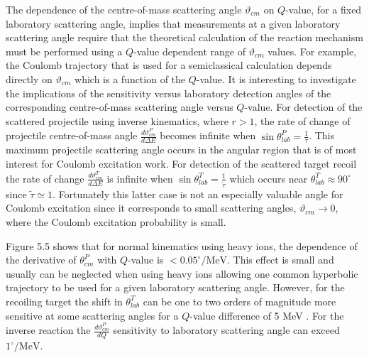 \documentclass[10pt]{article}
\begin{document}
The dependence of the centre-of-mass scattering angle $\vartheta_{c m}$ on $Q$-value, for a fixed laboratory scattering angle, implies that measurements at a given laboratory scattering angle require that the theoretical calculation of the reaction mechanism must be performed using a $Q$-value dependent range of $\vartheta_{c m}$ values. For example, the Coulomb trajectory that is used for a semiclassical calculation depends directly on $\vartheta_{c m}$ which is a function of the $Q$-value. It is interesting to investigate the implications of the sensitivity versus laboratory detection angles of the corresponding centre-of-mass scattering angle versus $Q$-value. For detection of the scattered projectile using inverse kinematics, where $r>1$, the rate of change of projectile centre-of-mass angle $\frac{d \vartheta_{c m}^{P}}{d \Delta E}$ becomes infinite when $\sin \theta_{l a b}^{P}=\frac{1}{\tau}$. This maximum projectile scattering angle occurs in the angular region that is of most interest for Coulomb excitation work. For detection of the scattered target recoil the rate of change $\frac{d \vartheta_{c m}^{T}}{d \Delta E}$ is infinite when $\sin \theta_{l a b}^{T}=\frac{1}{\tilde{\tau}}$ which occurs near $\theta_{l a b}^{T} \approx 90^{\circ}$ since $\tilde{\tau} \simeq 1$. Fortunately this latter case is not an especially valuable angle for Coulomb excitation since it corresponds to small scattering angles, $\vartheta_{c m} \rightarrow 0$, where the Coulomb excitation probability is small.

Figure 5.5 shows that for normal kinematics using heavy ions, the dependence of the derivative of $\theta_{c m}^{P}$ with $Q$-value is $<0.05^{\circ} / \mathrm{MeV}$. This effect is small and usually can be neglected when using heavy ions allowing one common hyperbolic trajectory to be used for a given laboratory scattering angle. However, for the recoiling target the shift in $\theta_{l a b}^{T}$ can be one to two orders of magnitude more sensitive at some scattering angles for a $Q$-value difference of 5 MeV . For the inverse reaction the $\frac{d \vartheta_{c m}^{P}}{d Q}$ sensitivity to laboratory scattering angle can exceed $1^{\circ} / \mathrm{MeV}$.
\end{document}

